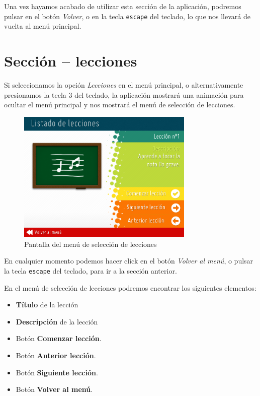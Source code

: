 Una vez hayamos acabado de utilizar esta sección de la aplicación, podremos
pulsar en el botón \textit{Volver}, o en la tecla \texttt{escape} del teclado,
lo que nos llevará de vuelta al menú principal.

\section{Sección -- lecciones}
\vspace{-0.5cm}
Si seleccionamos la opción \textit{Lecciones} en el menú principal, o
alternativamente presionamos la tecla 3 del teclado, la aplicación mostrará una
animación para ocultar el menú principal y nos mostrará el menú de selección de
lecciones. 

\begin{figure}[h!]
  \vspace{-0.2cm}
  \centering
  \includegraphics[width=0.75\textwidth]{apendice_manual_usuario/imagen_seccionLecciones1}
  \caption{Pantalla del menú de selección de lecciones}
  \vspace{-1cm}
\end{figure}

\pagebreak

En cualquier momento podemos hacer click en el botón \textit{Volver al menú}, o
pulsar la tecla \texttt{escape} del teclado, para ir a la sección anterior.

En el menú de selección de lecciones podremos encontrar los siguientes
elementos:

\begin{itemize}
\item \textbf{Título} de la lección
\item \textbf{Descripción} de la lección
\item Botón \textbf{Comenzar lección}.
\item Botón \textbf{Anterior lección}.
\item Botón \textbf{Siguiente lección}.
\item Botón \textbf{Volver al menú}.
\end{itemize}

